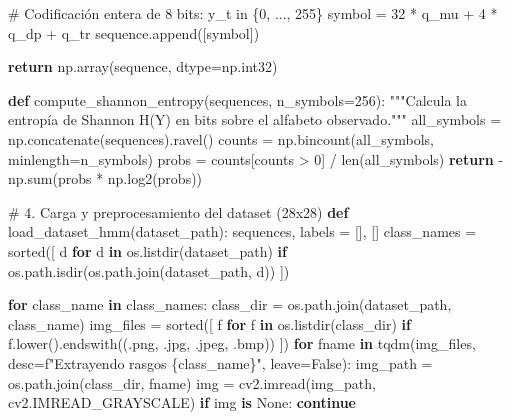 \documentclass[
  spanish,
  us-letterpaper,
]{scrreprt}
\newenvironment{Shaded}{\begin{snugshade}}{\end{snugshade}}
\newcommand{\BuiltInTok}[1]{\textcolor[rgb]{0.00,0.23,0.31}{#1}}
\newcommand{\CommentTok}[1]{\textcolor[rgb]{0.37,0.37,0.37}{#1}}
\newcommand{\ControlFlowTok}[1]{\textcolor[rgb]{0.00,0.23,0.31}{\textbf{#1}}}
\newcommand{\DecValTok}[1]{\textcolor[rgb]{0.68,0.00,0.00}{#1}}
\newcommand{\KeywordTok}[1]{\textcolor[rgb]{0.00,0.23,0.31}{\textbf{#1}}}
\newcommand{\NormalTok}[1]{\textcolor[rgb]{0.00,0.23,0.31}{#1}}
\newcommand{\OperatorTok}[1]{\textcolor[rgb]{0.37,0.37,0.37}{#1}}
\newcommand{\SpecialCharTok}[1]{\textcolor[rgb]{0.37,0.37,0.37}{#1}}
\newcommand{\SpecialStringTok}[1]{\textcolor[rgb]{0.13,0.47,0.30}{#1}}
\newcommand{\StringTok}[1]{\textcolor[rgb]{0.13,0.47,0.30}{#1}}
\newcommand{\VariableTok}[1]{\textcolor[rgb]{0.07,0.07,0.07}{#1}}
\theoremstyle{definition}
\theoremstyle{remark}
\begin{document}
\begin{Shaded}
\begin{Highlighting}[]
        \CommentTok{\# Codificación entera de 8 bits: y\_t in \{0, ..., 255\}}
\NormalTok{        symbol }\OperatorTok{=} \DecValTok{32} \OperatorTok{*}\NormalTok{ q\_mu }\OperatorTok{+} \DecValTok{4} \OperatorTok{*}\NormalTok{ q\_dp }\OperatorTok{+}\NormalTok{ q\_tr}
\NormalTok{        sequence.append([symbol])}

    \ControlFlowTok{return}\NormalTok{ np.array(sequence, dtype}\OperatorTok{=}\NormalTok{np.int32)}

\KeywordTok{def}\NormalTok{ compute\_shannon\_entropy(sequences, n\_symbols}\OperatorTok{=}\DecValTok{256}\NormalTok{):}
    \CommentTok{"""Calcula la entropía de Shannon H(Y) en bits sobre el alfabeto observado."""}
\NormalTok{    all\_symbols }\OperatorTok{=}\NormalTok{ np.concatenate(sequences).ravel()}
\NormalTok{    counts }\OperatorTok{=}\NormalTok{ np.bincount(all\_symbols, minlength}\OperatorTok{=}\NormalTok{n\_symbols)}
\NormalTok{    probs }\OperatorTok{=}\NormalTok{ counts[counts }\OperatorTok{\textgreater{}} \DecValTok{0}\NormalTok{] }\OperatorTok{/} \BuiltInTok{len}\NormalTok{(all\_symbols)}
    \ControlFlowTok{return} \OperatorTok{{-}}\NormalTok{np.}\BuiltInTok{sum}\NormalTok{(probs }\OperatorTok{*}\NormalTok{ np.log2(probs))}

\CommentTok{\# 4. Carga y preprocesamiento del dataset (28x28)}
\KeywordTok{def}\NormalTok{ load\_dataset\_hmm(dataset\_path):}
\NormalTok{    sequences, labels }\OperatorTok{=}\NormalTok{ [], []}
\NormalTok{    class\_names }\OperatorTok{=} \BuiltInTok{sorted}\NormalTok{([}
\NormalTok{        d }\ControlFlowTok{for}\NormalTok{ d }\KeywordTok{in}\NormalTok{ os.listdir(dataset\_path)}
        \ControlFlowTok{if}\NormalTok{ os.path.isdir(os.path.join(dataset\_path, d))}
\NormalTok{    ])}

    \ControlFlowTok{for}\NormalTok{ class\_name }\KeywordTok{in}\NormalTok{ class\_names:}
\NormalTok{        class\_dir }\OperatorTok{=}\NormalTok{ os.path.join(dataset\_path, class\_name)}
\NormalTok{        img\_files }\OperatorTok{=} \BuiltInTok{sorted}\NormalTok{([}
\NormalTok{            f }\ControlFlowTok{for}\NormalTok{ f }\KeywordTok{in}\NormalTok{ os.listdir(class\_dir)}
            \ControlFlowTok{if}\NormalTok{ f.lower().endswith((}\StringTok{\textquotesingle{}.png\textquotesingle{}}\NormalTok{, }\StringTok{\textquotesingle{}.jpg\textquotesingle{}}\NormalTok{, }\StringTok{\textquotesingle{}.jpeg\textquotesingle{}}\NormalTok{, }\StringTok{\textquotesingle{}.bmp\textquotesingle{}}\NormalTok{))}
\NormalTok{        ])}
        \ControlFlowTok{for}\NormalTok{ fname }\KeywordTok{in}\NormalTok{ tqdm(img\_files, desc}\OperatorTok{=}\SpecialStringTok{f"Extrayendo rasgos \textquotesingle{}}\SpecialCharTok{\{}\NormalTok{class\_name}\SpecialCharTok{\}}\SpecialStringTok{\textquotesingle{}"}\NormalTok{, leave}\OperatorTok{=}\VariableTok{False}\NormalTok{):}
\NormalTok{            img\_path }\OperatorTok{=}\NormalTok{ os.path.join(class\_dir, fname)}
\NormalTok{            img }\OperatorTok{=}\NormalTok{ cv2.imread(img\_path, cv2.IMREAD\_GRAYSCALE)}
            \ControlFlowTok{if}\NormalTok{ img }\KeywordTok{is} \VariableTok{None}\NormalTok{:}
                \ControlFlowTok{continue}


\end{Highlighting}
\end{Shaded}
\end{document}
